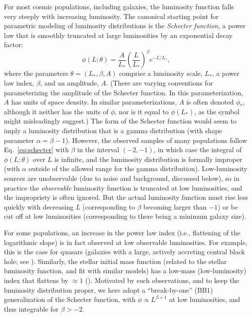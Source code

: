\documentclass[12pt]{article}
\numberwithin{equation}{section}
\numberwithin{figure}{section}
\numberwithin{table}{section}
\newcommand{\lfunc}{\phi}  %
\begin{document}
For most cosmic populations, including galaxies, the luminosity function falls very steeply with increasing luminosity.
The canonical starting point for parametric modeling of luminosity distributions is the \emph{Schecter function}, a power law that is smoothly truncated at large luminosities by an exponential decay factor:
\begin{equation}
\lfunc(L;\theta) =
  \frac{A}{L_*} \left(\frac{L}{L_*}\right)^{\beta} e^{-L/L_*},
\label{eq:schecter}
\end{equation}
where the parameters $\theta = (L_*,\beta, A)$ comprise a luminosity scale, $L_*$, a power law index, $\beta$, and an amplitude, $A$.
(There are varying conventions for parameterizing the amplitude of the Schecter function.
In this parameterization, $A$ has units of space density.
In similar parameterizations, $A$ is often denoted $\lfunc_*$, although it neither has the units of $\lfunc$, nor is it equal to $\lfunc(L_*)$, as the symbol might misleadingly suggest.)
The form of the Schecter function would seem to imply a luminosity distribution that is a gamma distribution (with shape parameter $\alpha = \beta - 1$).
However, the observed samples of many populations follow Eq.~\ref{eq:schecter} with $\beta$ in the interval $(-2,-1)$, in which case the integral of $\lfunc(L;\theta)$ over $L$ is infinite, and the luminosity distribution is formally improper (with $\alpha$ outside of the allowed range for the gamma distribution).
Low-luminosity sources are unobservable (due to noise and background, discussed below), so in practice the \emph{observable} luminosity function is truncated at low luminosities, and the impropriety is often ignored.
But the actual luminosity function must rise less quickly with decreasing $L$ (corresponding to $\beta$ becoming larger than $-1$) or be cut off at low luminosities (corresponding to there being a minimum galaxy size).

For some populations, an increase in the power law index (i.e., flattening of the logarithmic slope) is in fact observed at low observable luminosities.
For example, this is the case for quasars (galaxies with a large, actively accreting central black hole; see \citealt{M+13-QuasarLumFunc}).
Similarly, the stellar initial mass function (related to the stellar luminosity function, and fit with similar models) has a low-mass (low-luminosity) index that flattens by $\approx 1$ (\citealt{K07-IMF-BPL}).
Motivated by such observations, and to keep the luminosity distribution proper, we here adopt a ``break-by-one'' (BB1) generalization of the Schecter function, with $\lfunc \propto L^{\beta+1}$ at low luminosities, and thus integrable for $\beta > -2$.
\end{document}
